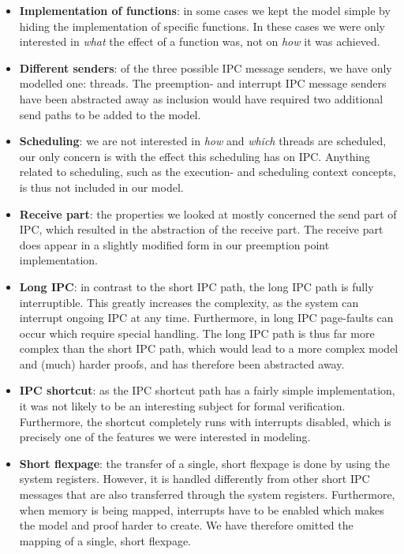 \begin{itemize}
 \item \textbf{Implementation of functions}: in some cases we kept the model simple by hiding the implementation of specific functions. In these cases we were only interested in \textit{what} the effect of a function was, not on \textit{how} it was achieved.
 \item \textbf{Different senders}: of the three possible IPC message senders, we have only modelled one: threads. The preemption- and interrupt IPC message senders have been abstracted away as inclusion would have required two additional send paths to be added to the model.
 \item \textbf{Scheduling}: we are not interested in \textit{how} and \textit{which} threads are scheduled, our only concern is with the effect this scheduling has on IPC. Anything related to scheduling, such as the execution- and scheduling context concepts, is thus not included in our model.
 \item \textbf{Receive part}: the properties we looked at mostly concerned the send part of IPC, which resulted in the abstraction of the receive part. The receive part does appear in a slightly modified form in our preemption point implementation.
 \item \textbf{Long IPC}: in contrast to the short IPC path, the long IPC path is fully interruptible. This greatly increases the complexity, as the system can interrupt ongoing IPC at any time. Furthermore, in long IPC page-faults can occur which require special handling. The long IPC path is thus far more complex than the short IPC path, which would lead to a more complex model and (much) harder proofs, and has therefore been abstracted away.
 \item \textbf{IPC shortcut}: as the IPC shortcut path has a fairly simple implementation, it was not likely to be an interesting subject for formal verification. Furthermore, the shortcut completely runs with interrupts disabled, which is precisely one of the features we were interested in modeling.
 \item \textbf{Short flexpage}: the transfer of a single, short flexpage is done by using the system registers. However, it is handled differently from other short IPC messages that are also transferred through the system registers. Furthermore, when memory is being mapped, interrupts have to be enabled which makes the model and proof harder to create. We have therefore omitted the mapping of a single, short flexpage.
\end{itemize}

